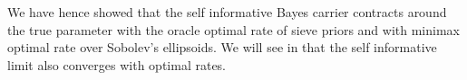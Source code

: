 \begin{il}
\ilEnd
\end{il}

We have hence showed that the self informative Bayes carrier contracts around the true parameter with the oracle optimal rate of sieve priors and with minimax optimal rate over Sobolev's ellipsoids.
We will see in  that the self informative limit also converges with optimal rates.